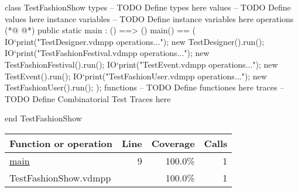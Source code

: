 \begin{vdmpp}[breaklines=true]
class TestFashionShow
types
-- TODO Define types here
values
-- TODO Define values here
instance variables
-- TODO Define instance variables here
operations
(*@
\label{main:9}
@*)
public static main : () ==> ()
  main() ==
  (
    IO`print("\nExecuting TestDesigner.vdmpp operations...\n");
    new TestDesigner().run();
    IO`print("\nExecuting TestFashionFestival.vdmpp operations...\n");
    new TestFashionFestival().run();
    IO`print("\nExecuting TestEvent.vdmpp operations...\n");
    new TestEvent().run();
    IO`print("\nExecuting TestFashionUser.vdmpp operations...\n");
    new TestFashionUser().run();
  );
functions
-- TODO Define functiones here
traces
-- TODO Define Combinatorial Test Traces here


end TestFashionShow
\end{vdmpp}
\bigskip
\begin{longtable}{|l|r|r|r|}
\hline
Function or operation & Line & Coverage & Calls \\
\hline
\hline
\hyperref[main:9]{main} & 9&100.0\% & 1 \\
\hline
\hline
TestFashionShow.vdmpp & & 100.0\% & 1 \\
\hline
\end{longtable}

